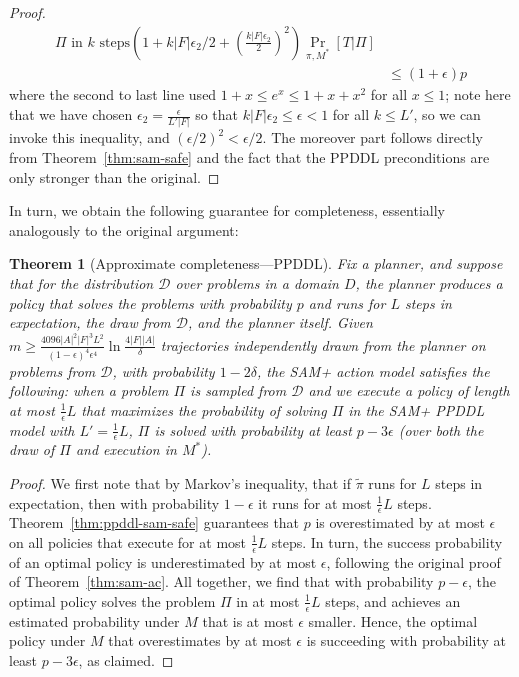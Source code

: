 \documentclass[letterpaper]{article} %
\newtheorem{theorem}{Theorem}
\begin{document}
\begin{proof}
\begin{align*}
{{\Pi\text{ in }k\text{ steps}}}(1+k|F|\epsilon_2/2+\left(\frac{k|F|\epsilon_2}{2}\right)^2)\Pr_{\pi,M^*}[T|\Pi]\\
&\leq (1+\epsilon)p
\end{align*}
where the second to last line used
$
1+x\leq e^x\leq 1+x+x^2
$
for all $x\leq 1$; note here that we have chosen $\epsilon_2=\frac{\epsilon}{L'|F|}$ so that $k|F|\epsilon_2\leq \epsilon < 1$ for all $k\leq L'$, so we can invoke this inequality, and $(\epsilon/2)^2<\epsilon/2$. The moreover part follows directly from Theorem~\ref{thm:sam-safe} and the fact that the PPDDL preconditions are only stronger than the original.
\end{proof}

In turn, we obtain the following guarantee for completeness, essentially analogously to the original argument:
\begin{theorem}[Approximate completeness---PPDDL]
\label{thm:ppddl-sam-ac}
Fix a planner, and suppose that for the distribution $\mathcal{D}$ over problems in a domain $D$, the planner produces a policy that solves the problems with probability $p$ and runs for $L$ steps in expectation, the draw from $\mathcal{D}$, and the planner itself.
Given 
$
m\geq \frac{4096|A|^2|F|^3L^2}{(1-\epsilon)^4\epsilon^4}\ln\frac{4|F||A|}{\delta}
$
trajectories independently drawn from the planner on problems from $\mathcal{D}$, with probability $1-2\delta$, the SAM+ action model satisfies the following:  when a problem $\Pi$ is sampled from $\mathcal{D}$ and we execute a policy of length at most $\frac{1}{\epsilon}L$ that maximizes the probability of solving $\Pi$ in the SAM+ PPDDL model with $L'=\frac{1}{\epsilon}L$, $\Pi$ is solved with probability at least $p-3\epsilon$ (over both the draw of $\Pi$ and execution in $M^*$).
\end{theorem}
\begin{proof}
We first note that by Markov's inequality, that if $\tilde{\pi}$ runs for $L$ steps in expectation, then with probability $1-\epsilon$ it runs for at most $\frac{1}{\epsilon}L$ steps. Theorem~\ref{thm:ppddl-sam-safe} guarantees that $p$ is overestimated by at most $\epsilon$ on all policies that execute for at most $\frac{1}{\epsilon}L$ steps. In turn, the success probability of an optimal policy is underestimated by at most $\epsilon$, following the original proof of Theorem~\ref{thm:sam-ac}. All together, we find that with probability $p-\epsilon$, the optimal policy solves the problem $\Pi$ in at most $\frac{1}{\epsilon}L$ steps, and achieves an estimated probability under $M$ that is at most $\epsilon$ smaller. Hence, the optimal policy under $M$ that overestimates by at most $\epsilon$ is succeeding with probability at least $p-3\epsilon$, as claimed. 
\end{proof}
\end{document}
